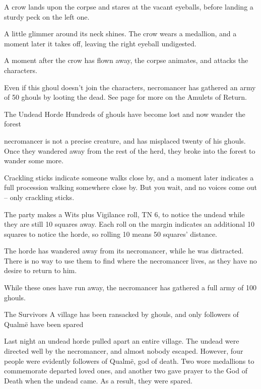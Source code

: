 \begin{multicols}{2}
\begin{boxtext}
	A crow lands upon the corpse and stares at the vacant eyeballs, before landing a sturdy peck on the left one.

	A little glimmer around its neck shines.  The crow wears a medallion, and a moment later it takes off, leaving the right eyeball undigested.

\end{boxtext}

A moment after the crow has flown away, the corpse animates, and attacks the characters.


Even if this ghoul doesn't join the characters, \gls{necromancer} has gathered an army of 50 ghouls by looting the dead.
See page \pageref{ghoulNecklace} for more on the Amulets of Return.

{The Undead Horde}%
{Hundreds of ghouls have become lost and now wander the forest}%

\Gls{necromancer} is not a precise creature, and has misplaced twenty of his ghouls.
Once they wandered away from the rest of the herd, they broke into the forest to wander some more.

\begin{boxtext}

	Crackling sticks indicate someone walks close by, and a moment later indicates a full procession walking somewhere close by.
	But you wait, and no voices come out -- only crackling sticks.

\end{boxtext}

The party makes a Wits plus Vigilance roll, TN 6, to notice the undead while they are still 10 squares away.
Each roll on the margin indicates an additional 10 squares to notice the horde, so rolling 10 means 50 squares' distance.

The horde has wandered away from its necromancer, while he was distracted.
There is no way to use them to find where the necromancer lives, as they have no desire to return to him.

While these ones have run away, the necromancer has gathered a full army of 100 ghouls.

{The Survivors}%
{A village has been ransacked by ghouls, and only followers of Qualm\"{e} have been spared}%

Last night an undead horde pulled apart an entire village.  The undead were directed well by the necromancer, and almost nobody escaped.
However, four people were evidently followers of Qualm\"{e}, god of death.
Two wore medallions to commemorate departed loved ones, and another two gave prayer to the God of Death when the undead came.
As a result, they were spared.


\end{multicols}
